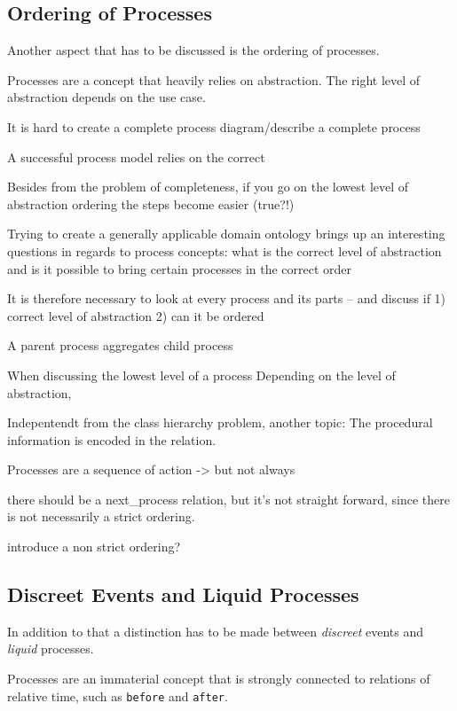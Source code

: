 \documentclass[a4paper, DIV=13, BCOR=0cm]{scrbook}
\newcommand{\relation}[1]{\texttt{#1}}
\begin{document}
\subsection{Ordering of Processes}
Another aspect that has to be discussed is the ordering of processes.

Processes are a concept that heavily relies on abstraction. The right level of abstraction depends on the use case.

\begin{compactenum}
	\item It is hard to create a complete process diagram/describe a complete process
	\item A successful process model relies on the correct
	\item Besides from the problem of completeness, if you go on the lowest level of abstraction ordering the steps become easier (true?!)
	\item Trying to create a generally applicable domain ontology brings up an interesting questions in regards to process concepts: what is the correct level of abstraction and is it possible to bring certain processes in the correct order
	\item It is therefore necessary to look at every process and its parts -- and discuss if 1) correct level of abstraction 2) can it be ordered
	\item A parent process aggregates child process

	\item When discussing the lowest level of a process Depending on the level of abstraction,
	\item Indepentendt from the class hierarchy problem, another topic: The procedural information is encoded in the relation.
	\item Processes are a sequence of action -> but not always
	\item there should be a next\_process relation, but it's not straight forward, since there is not necessarily a strict ordering.
	\item introduce a non strict ordering?
\end{compactenum}

\subsection{Discreet Events and Liquid Processes}

\begin{compactenum}
\item In addition to that a distinction has to be made between \textit{discreet} events and \textit{liquid} processes. \cite[p.\,447]{Russell:2010aa}
\item Processes are an immaterial concept that is strongly connected to relations of relative time, such as \relation{before} and \relation{after}.
\end{compactenum}
\end{document}
